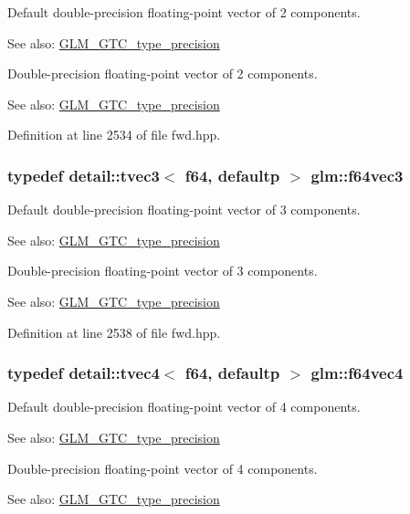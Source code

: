 Default double-precision floating-point vector of 2 components. \begin{Desc}
\item[See also:]\hyperlink{group__gtc__type__precision}{GLM\_\-GTC\_\-type\_\-precision}\end{Desc}
Double-precision floating-point vector of 2 components. \begin{Desc}
\item[See also:]\hyperlink{group__gtc__type__precision}{GLM\_\-GTC\_\-type\_\-precision} \end{Desc}


Definition at line 2534 of file fwd.hpp.\hypertarget{group__gtc__type__precision_g794ee8f0a105cda01946cd9860f492a8}{
\subsubsection[f64vec3]{\setlength{\rightskip}{0pt plus 5cm}typedef detail::tvec3$<$ f64, defaultp $>$ {\bf glm::f64vec3}}}
\label{group__gtc__type__precision_g794ee8f0a105cda01946cd9860f492a8}


Default double-precision floating-point vector of 3 components. \begin{Desc}
\item[See also:]\hyperlink{group__gtc__type__precision}{GLM\_\-GTC\_\-type\_\-precision}\end{Desc}
Double-precision floating-point vector of 3 components. \begin{Desc}
\item[See also:]\hyperlink{group__gtc__type__precision}{GLM\_\-GTC\_\-type\_\-precision} \end{Desc}


Definition at line 2538 of file fwd.hpp.\hypertarget{group__gtc__type__precision_gc10d088c5f1d16a62fb019408af34e1b}{
\subsubsection[f64vec4]{\setlength{\rightskip}{0pt plus 5cm}typedef detail::tvec4$<$ f64, defaultp $>$ {\bf glm::f64vec4}}}
\label{group__gtc__type__precision_gc10d088c5f1d16a62fb019408af34e1b}


Default double-precision floating-point vector of 4 components. \begin{Desc}
\item[See also:]\hyperlink{group__gtc__type__precision}{GLM\_\-GTC\_\-type\_\-precision}\end{Desc}
Double-precision floating-point vector of 4 components. \begin{Desc}
\item[See also:]\hyperlink{group__gtc__type__precision}{GLM\_\-GTC\_\-type\_\-precision} \end{Desc}


